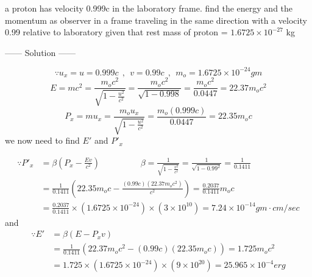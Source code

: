 \documentclass{article}
\begin{document}
\newpage
\begin{example}
a proton has velocity 0.999c in the laboratory frame. find the energy and the momentum as observer in a frame traveling in the same direction with a velocity 0.99 relative to laboratory given that rest mass of proton = $1.6725 \times 10^{-27}$ kg
\begin{center}
    ------ \textcolor{Solution}{Solution} ------
\end{center}
\[
\because u_x = u = 0.999c \ \ , \ \ v = 0.99c \ \ , \ \ m_o = 1.6725 \times 10^{-24} \si{gm}
\]
\[
E = m c^2  = \frac{m_o c^2}{\sqrt{1 - \frac{u^2}{c^2}}} = \frac{m_o c^2}{\sqrt{1 - 0.998}} = \frac{m_o c^2}{0.0447} = 22.37 m_o c^2
\]
\[
P_x = m u_x = \frac{m_o u_x}{\sqrt{1 - \frac{u^2}{c^2}}} = \frac{m_o (0.999c)}{0.0447} = 22.35 m_o c
\]
we now need to find $E'$ and $P'_x$


\begin{align*}
    \because P'_x &= \beta\left(P_x - \frac{Ev}{c^2}\right) \hspace{2cm} \beta = \frac{1}{\sqrt{1-\frac{v^2}{c^2}}} = \frac{1}{\sqrt{1-0.99^2}} = \frac{1}{0.1411}\\
    &= \frac{1}{0.1411}\left(22.35 m_o c - \frac{(0.99c)(22.37 m_o c^2)}{c^2}\right) = \frac{0.2037}{0.1411}m_o c\\
    &= \frac{0.2037}{0.1411} \times \left(1.6725 \times 10^{-24}\right) \times \left(3 \times 10^{10}\right) = 7.24 \times 10^{-14} \si{gm} \cdot \si{cm/sec}
\end{align*}
and
\begin{align*}
    \because E' &= \beta\left(E - P_xv\right)\\
    &=\frac{1}{0.1411} \left(22.37 m_o c^2 - (0.99c)(22.35 m_o c)\right) = 1.725 m_o c^2\\
    &=1.725 \times \left(1.6725 \times 10^{-24}\right) \times \left(9 \times 10^{20}\right) = 25.965 \times 10^{-4} \si{erg}
\end{align*}
\end{example}
\end{document}
